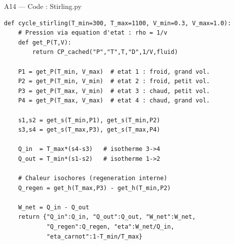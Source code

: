 \documentclass[aspectratio=43, 10pt]{beamer}
\begin{document}
\begin{frame}[fragile]{A14 --- Code : Stirling.py}

  \begin{exampleblock}{}
  \begin{lstlisting}
def cycle_stirling(T_min=300, T_max=1100, V_min=0.3, V_max=1.0):
    # Pression via equation d'etat : rho = 1/v
    def get_P(T,V):
        return CP_cached("P","T",T,"D",1/V,fluid)

    P1 = get_P(T_min, V_max)  # etat 1 : froid, grand vol.
    P2 = get_P(T_min, V_min)  # etat 2 : froid, petit vol.
    P3 = get_P(T_max, V_min)  # etat 3 : chaud, petit vol.
    P4 = get_P(T_max, V_max)  # etat 4 : chaud, grand vol.

    s1,s2 = get_s(T_min,P1), get_s(T_min,P2)
    s3,s4 = get_s(T_max,P3), get_s(T_max,P4)

    Q_in  = T_max*(s4-s3)   # isotherme 3->4
    Q_out = T_min*(s1-s2)   # isotherme 1->2

    # Chaleur isochores (regeneration interne)
    Q_regen = get_h(T_max,P3) - get_h(T_min,P2)

    W_net = Q_in - Q_out
    return {"Q_in":Q_in, "Q_out":Q_out, "W_net":W_net,
            "Q_regen":Q_regen, "eta":W_net/Q_in,
            "eta_carnot":1-T_min/T_max}
  \end{lstlisting}
  \end{exampleblock}

\end{frame}
\end{document}
